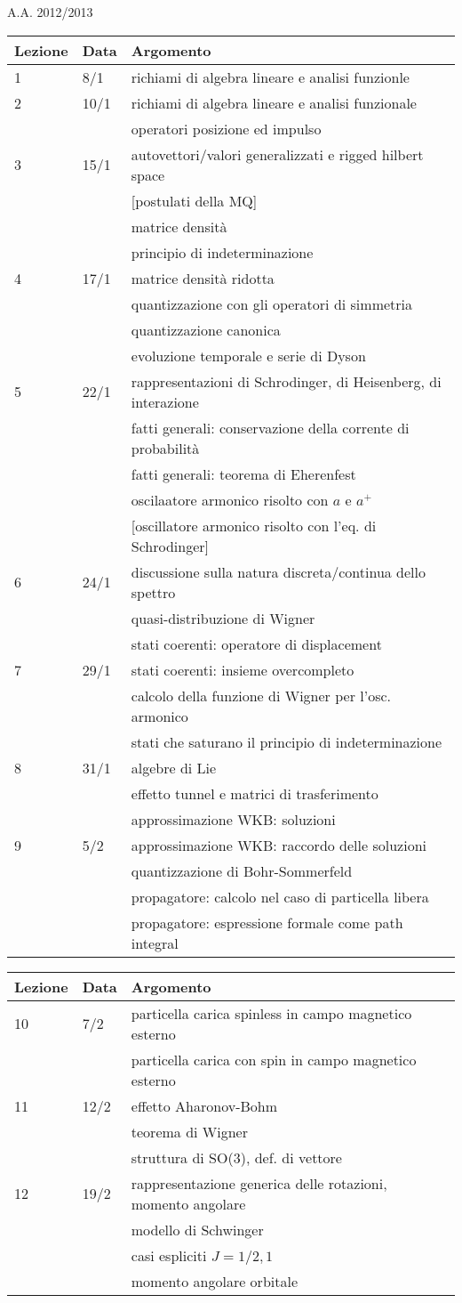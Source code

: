 \documentclass[a4paper, 12pt]{article}
\newcommand{\nl}{\\ & & }
\newcommand{\nr}{\\ \midrule}
\begin{document}
 

\begin{section}{A.A. 2012/2013}
\begin{tabular}{lll}
\toprule
Lezione & Data & Argomento\nr

1 & 8/1 & richiami di algebra lineare e analisi funzionle\nr
 
2 & 10/1 & richiami di algebra lineare e analisi funzionale \nl operatori posizione ed impulso\nr

3 & 15/1 & autovettori/valori generalizzati e rigged hilbert space \nl [postulati della MQ] \nl matrice densità \nl principio di indeterminazione\nr

4 & 17/1 & matrice densità ridotta \nl quantizzazione con gli operatori di simmetria \nl quantizzazione canonica \nl evoluzione temporale e serie di Dyson\nr

5 & 22/1 & rappresentazioni di Schrodinger, di Heisenberg, di interazione \nl fatti generali: conservazione della corrente di probabilità \nl fatti generali: teorema di Eherenfest \nl oscilaatore armonico risolto con $a$ e $a^+$ \nl [oscillatore armonico risolto con l'eq. di Schrodinger] \nr

6 & 24/1 & discussione sulla natura discreta/continua dello spettro\nl quasi-distribuzione di Wigner \nl stati coerenti: operatore di displacement \nr

7 & 29/1 & stati coerenti: insieme overcompleto \nl calcolo della funzione di Wigner per l'osc. armonico \nl stati che saturano il principio di indeterminazione \nr

8 & 31/1 & algebre di Lie \nl effetto tunnel e matrici di trasferimento \nl approssimazione WKB: soluzioni \nr

9 & 5/2 & approssimazione WKB: raccordo delle soluzioni \nl quantizzazione di Bohr-Sommerfeld \nl propagatore: calcolo nel caso di particella libera \nl propagatore: espressione formale come path integral \nr

\end{tabular}

\begin{tabular}{lll}
Lezione & Data & Argomento\nr

10 & 7/2 & particella carica spinless in campo magnetico esterno \nl particella carica con spin in campo magnetico esterno \nr

11 & 12/2 & effetto Aharonov-Bohm \nl teorema di Wigner \nl struttura di SO(3), def. di vettore \nr 

12 & 19/2 & rappresentazione generica delle rotazioni, momento angolare \nl modello di Schwinger \nl casi espliciti $J=1/2,1$ \nl momento angolare orbitale  \nr 


\end{tabular}
\end{section}
\end{document}
